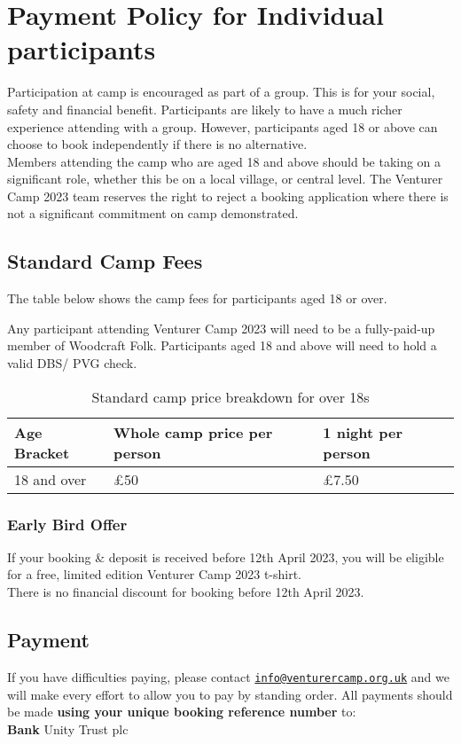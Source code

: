 \chapter{Payment Policy for Individual participants}
Participation at camp is encouraged as part of a group. This is for your social, safety and financial benefit. Participants are likely to have a much richer experience attending with a group. However, participants aged 18 or above can choose to book independently if there is no alternative.\\[1em]
Members attending the camp who are aged 18 and above should be taking on a significant role, whether this be on a local village, or central level. The Venturer Camp 2023 team reserves the right to reject a booking application where there is not a significant commitment on camp demonstrated.

\section{Standard Camp Fees}
The table below shows the camp fees for participants aged 18 or over.

Any participant attending Venturer Camp 2023 will need to be a fully-paid-up member of Woodcraft Folk. Participants aged 18 and above will need to hold a valid DBS/ PVG check.
\begin{table}[H]
    \centering   
    \begin{tabularx}{0.9\textwidth}{XXX}
        \textbf{Age Bracket} & \textbf{Whole camp price per person} & \textbf{1 night per person} \\
        \hline
        \hline
        18 and over & £50 & £7.50\\
        \hline
    \end{tabularx}
    \caption{Standard camp price breakdown for over 18s}
\end{table}

\subsection{Early Bird Offer}
If your booking \& deposit is received before 12th April 2023, you will be eligible for a free, limited edition Venturer Camp 2023 t-shirt.\\[1em]
There is no financial discount for booking before 12th April 2023.

\section{Payment}
If you have difficulties paying, please contact \href{mailto:info@venturercamp.org.uk}{\texttt{info@venturercamp.org.uk}} and we will make every effort to allow you to pay by standing order.
All payments should be made \textbf{using your unique booking reference number} to:\\
\textbf{Bank} Unity Trust plc

